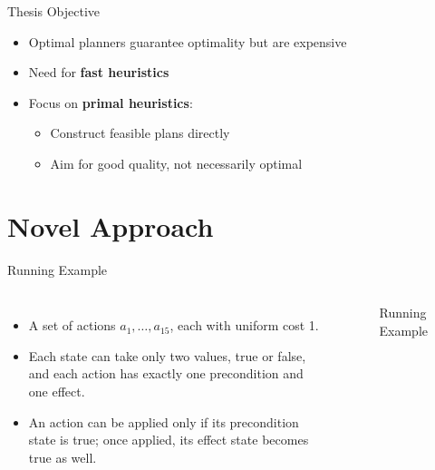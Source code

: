 \documentclass[aspectratio=169,xcolor=dvipsnames]{beamer}
\begin{document}
\begin{frame}{Thesis Objective}
	\begin{itemize}
		\item Optimal planners guarantee optimality but are expensive
		\item Need for \textbf{fast heuristics}
		\item Focus on \textbf{primal heuristics}:
		      \begin{itemize}
			      \item Construct feasible plans directly
			      \item Aim for good quality, not necessarily optimal
		      \end{itemize}
	\end{itemize}
\end{frame}

\section{Novel Approach}

\begin{frame}{Running Example}
	\begin{columns}[c] %
		\begin{itemize}
			\item A set of actions $a_1, \dots, a_{15}$, each with uniform cost 1.
			\item Each state can take only two values, true or false, and each action has exactly one precondition and one effect.
			\item An action can be applied only if its precondition state is true; once applied, its effect state becomes true as well.
		\end{itemize}

		\begin{figure}[ht]
			\centering
			\def\svgwidth{\linewidth}
			
			\caption{Running Example}
			\label{fig:running_example}
		\end{figure}
	\end{columns}
\end{frame}

\end{document}
